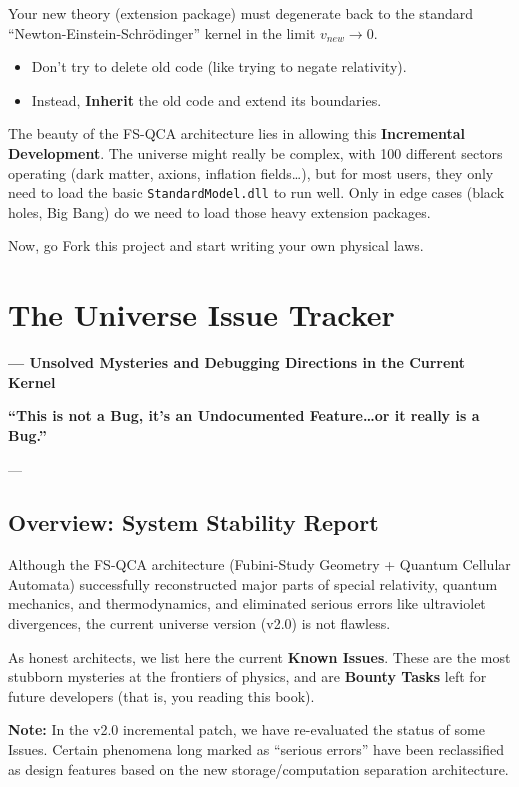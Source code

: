 \documentclass[11pt,a4paper,twoside]{book}
\begin{document}
Your new theory (extension package) must degenerate back to the standard ``Newton-Einstein-Schrödinger'' kernel in the limit $v_{new} \to 0$.

\begin{itemize}
\item Don't try to delete old code (like trying to negate relativity).

\item Instead, \textbf{Inherit} the old code and extend its boundaries.
\end{itemize}

The beauty of the FS-QCA architecture lies in allowing this \textbf{Incremental Development}. The universe might really be complex, with 100 different sectors operating (dark matter, axions, inflation fields\ldots), but for most users, they only need to load the basic \texttt{StandardModel.dll} to run well. Only in edge cases (black holes, Big Bang) do we need to load those heavy extension packages.

Now, go Fork this project and start writing your own physical laws.

\clearpage{}
\clearpage{}\chapter{The Universe Issue Tracker}

\textbf{--- Unsolved Mysteries and Debugging Directions in the Current Kernel}

\textbf{``This is not a Bug, it's an Undocumented Feature\ldots or it really is a Bug.''}

---

\section{Overview: System Stability Report}

Although the FS-QCA architecture (Fubini-Study Geometry + Quantum Cellular Automata) successfully reconstructed major parts of special relativity, quantum mechanics, and thermodynamics, and eliminated serious errors like ultraviolet divergences, the current universe version (v2.0) is not flawless.

As honest architects, we list here the current \textbf{Known Issues}. These are the most stubborn mysteries at the frontiers of physics, and are \textbf{Bounty Tasks} left for future developers (that is, you reading this book).

\textbf{Note:} In the v2.0 incremental patch, we have re-evaluated the status of some Issues. Certain phenomena long marked as ``serious errors'' have been reclassified as design features based on the new storage/computation separation architecture.
\end{document}
